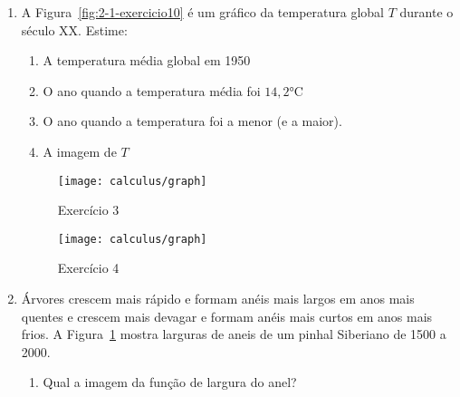 \begin{enumerate}[label=\textbf{\arabic*.},leftmargin=*]
  \vspace{0.2cm}
  \vspace{0.2cm}
  
  \item A Figura~\ref{fig:2-1-exercicio10} é um gráfico da temperatura global $T$ durante o século XX. Estime:
  \begin{enumerate}
    \item A temperatura média global em 1950
    \item O ano quando a temperatura média foi $14,2\si\degreeCelsius$
    \item O ano quando a temperatura foi a menor (e a maior).
    \item A imagem de $T$
  \end{enumerate}
    \begin{figure}[!ht]
    \centering
    \begin{minipage}{0.49\columnwidth}
      \texttt{[image: calculus/graph]}
      \caption{Exercício 3}
      \label{fig:2-1-exercicio10}
    \end{minipage}
    \begin{minipage}{0.49\columnwidth}
      \texttt{[image: calculus/graph]}
      \caption{Exercício 4}
      \label{fig:2-1-exercicio11}
    \end{minipage}
  \end{figure}
  \item Árvores crescem mais rápido e formam anéis mais largos em anos mais quentes e crescem mais devagar e formam anéis mais curtos em anos mais frios. A Figura~\ref{fig:2-1-exercicio11} mostra larguras de aneis de um pinhal Siberiano de 1500 a 2000.
  \begin{enumerate}
    \item Qual a imagem da função de largura do anel?

\end{enumerate}
\end{enumerate}

